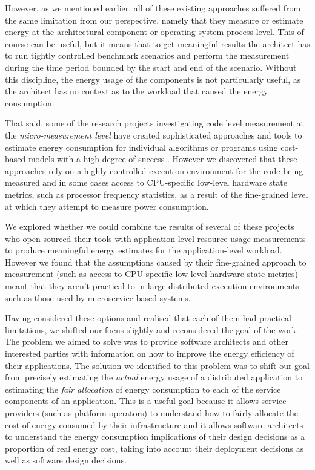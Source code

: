 However, as we mentioned earlier, all of these existing approaches suffered from the same limitation from our perspective, namely that they measure or estimate energy at the architectural component or operating system process level.  This of course can be useful, but it means that to get meaningful results the architect has to run tightly controlled benchmark scenarios and perform the measurement during the time period bounded by the start and end of the scenario.  Without this discipline, the energy usage of the components is not particularly useful, as the architect has no context as to the workload that caused the energy consumption.

That said, some of the research projects investigating code level measurement at the \emph{micro-measurement level} have created sophisticated approaches and tools to estimate energy consumption for individual algorithms or programs using cost-based models with a high degree of success \cite{noureddine2016-jolinar}.  However we discovered that these approaches rely on a highly controlled execution environment for the code being measured and in some cases access to CPU-specific low-level hardware state metrics, such as processor frequency statistics, as a result of the fine-grained level at which they attempt to measure power consumption.

We explored whether we could combine the results of several of these projects who open sourced their tools \cite{noureddine2016-jolinar, bourdon2013-powerapi} with application-level resource usage measurements to produce meaningful energy estimates for the application-level workload.  However we found that the assumptions caused by their fine-grained approach to measurement (such as access to CPU-specific low-level hardware state metrics) meant that they aren't practical to in large distributed execution environments such as those used by microservice-based systems.

Having considered these options and realised that each of them had practical limitations, we shifted our focus slightly and reconsidered the goal of the work.  The problem we aimed to solve was to provide software architects and other interested parties with information on how to improve the energy efficiency of their applications.  The solution we identified to this problem was to shift our goal from precisely estimating the \emph{actual} energy usage of a distributed application to estimating the \emph{fair allocation} of energy consumption to each of the service components of an application.  This is a useful goal because it allows service providers (such as platform operators) to understand how to fairly allocate the cost of energy consumed by their infrastructure and it allows software architects to understand the energy consumption implications of their design decisions as a proportion of real energy cost, taking into account their deployment decisions as well as software design decisions.

